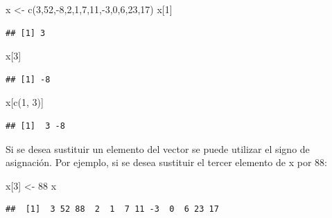 \documentclass[
]{book}
\newenvironment{Shaded}{\begin{snugshade}}{\end{snugshade}}
\newcommand{\DecValTok}[1]{\textcolor[rgb]{0.00,0.00,0.81}{#1}}
\newcommand{\FunctionTok}[1]{\textcolor[rgb]{0.00,0.00,0.00}{#1}}
\newcommand{\NormalTok}[1]{#1}
\newcommand{\OtherTok}[1]{\textcolor[rgb]{0.56,0.35,0.01}{#1}}
\newcommand{\SpecialCharTok}[1]{\textcolor[rgb]{0.00,0.00,0.00}{#1}}
\begin{document}
\begin{Shaded}
\begin{Highlighting}[]
\NormalTok{x }\OtherTok{\textless{}{-}} \FunctionTok{c}\NormalTok{(}\DecValTok{3}\NormalTok{,}\DecValTok{52}\NormalTok{,}\SpecialCharTok{{-}}\DecValTok{8}\NormalTok{,}\DecValTok{2}\NormalTok{,}\DecValTok{1}\NormalTok{,}\DecValTok{7}\NormalTok{,}\DecValTok{11}\NormalTok{,}\SpecialCharTok{{-}}\DecValTok{3}\NormalTok{,}\DecValTok{0}\NormalTok{,}\DecValTok{6}\NormalTok{,}\DecValTok{23}\NormalTok{,}\DecValTok{17}\NormalTok{)}
\NormalTok{x[}\DecValTok{1}\NormalTok{]}
\end{Highlighting}
\end{Shaded}

\begin{verbatim}
## [1] 3
\end{verbatim}

\begin{Shaded}
\begin{Highlighting}[]
\NormalTok{x[}\DecValTok{3}\NormalTok{]}
\end{Highlighting}
\end{Shaded}

\begin{verbatim}
## [1] -8
\end{verbatim}

\begin{Shaded}
\begin{Highlighting}[]
\NormalTok{x[}\FunctionTok{c}\NormalTok{(}\DecValTok{1}\NormalTok{, }\DecValTok{3}\NormalTok{)]}
\end{Highlighting}
\end{Shaded}

\begin{verbatim}
## [1]  3 -8
\end{verbatim}

Si se desea sustituir un elemento del vector se puede utilizar el signo de asignación.
Por ejemplo, si se desea sustituir el tercer elemento de x por 88:

\begin{Shaded}
\begin{Highlighting}[]
\NormalTok{x[}\DecValTok{3}\NormalTok{] }\OtherTok{\textless{}{-}}  \DecValTok{88}
\NormalTok{x}
\end{Highlighting}
\end{Shaded}

\begin{verbatim}
##  [1]  3 52 88  2  1  7 11 -3  0  6 23 17
\end{verbatim}
\end{document}
